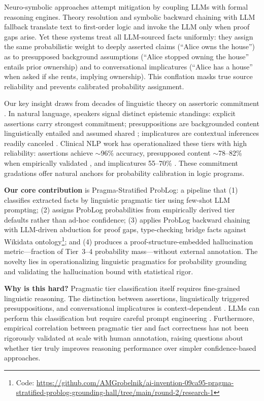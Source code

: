 \documentclass[11pt,letterpaper]{article}
\begin{document}
Neuro-symbolic approaches attempt mitigation by coupling LLMs with formal reasoning engines. Theory resolution \citep{Thawani2024} and symbolic backward chaining with LLM fallback \citep{Weir2024} translate text to first-order logic and invoke the LLM only when proof gaps arise. Yet these systems treat all LLM-sourced facts uniformly: they assign the same probabilistic weight to deeply asserted claims (``Alice owns the house'') as to presupposed background assumptions (``Alice stopped owning the house'' entails prior ownership) and to conversational implicatures (``Alice has a house'' when asked if she rents, implying ownership). This conflation masks true source reliability and prevents calibrated probability assignment.

Our key insight draws from decades of linguistic theory on assertoric commitment \citep{Grice1975,Stalnaker1978}. In natural language, speakers signal distinct epistemic standings: explicit assertions carry strongest commitment; presuppositions are backgrounded content linguistically entailed and assumed shared \citep{Stalnaker1978}; implicatures are contextual inferences readily canceled \citep{Grice1975}. Clinical NLP work has operationalized these tiers with high reliability: assertions achieve $\sim$96\% accuracy, presupposed content $\sim$78--82\% when empirically validated \citep{Sharifirad2025}, and implicatures 55--70\% \citep{Noveck2004,Cholia2017}. These commitment gradations offer natural anchors for probability calibration in logic programs.

\textbf{Our core contribution} is Pragma-Stratified ProbLog: a pipeline that (1) classifies extracted facts by linguistic pragmatic tier using few-shot LLM prompting; (2) assigns ProbLog probabilities from empirically derived tier defaults rather than ad-hoc confidence; (3) applies ProbLog backward chaining with LLM-driven abduction for proof gaps, type-checking bridge facts against Wikidata ontology\footnote{Code: \url{https://github.com/AMGrobelnik/ai-invention-09ca95-pragma-stratified-problog-grounding-hall/tree/main/round-2/research-1}}; and (4) produces a proof-structure-embedded hallucination metric---fraction of Tier~3--4 probability mass---without external annotation. The novelty lies in operationalizing linguistic pragmatics for probability grounding and validating the hallucination bound with statistical rigor.

\textbf{Why is this hard?} Pragmatic tier classification itself requires fine-grained linguistic reasoning. The distinction between assertions, linguistically triggered presuppositions, and conversational implicatures is context-dependent \citep{Grice1975}. LLMs can perform this classification but require careful prompt engineering \citep{Sun2024apie}. Furthermore, empirical correlation between pragmatic tier and fact correctness has not been rigorously validated at scale with human annotation, raising questions about whether tier truly improves reasoning performance over simpler confidence-based approaches.
\end{document}
